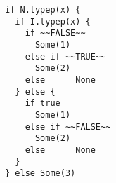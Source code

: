 \begin{lstlisting}[style=reclojureScala]
if N.typep(x) {
  if I.typep(x) {
    if ~~FALSE~~
      Some(1)
    else if ~~TRUE~~
      Some(2)
    else      None
  } else {
    if true
      Some(1)
    else if ~~FALSE~~
      Some(2)
    else      None
  }
} else Some(3)
\end{lstlisting}
